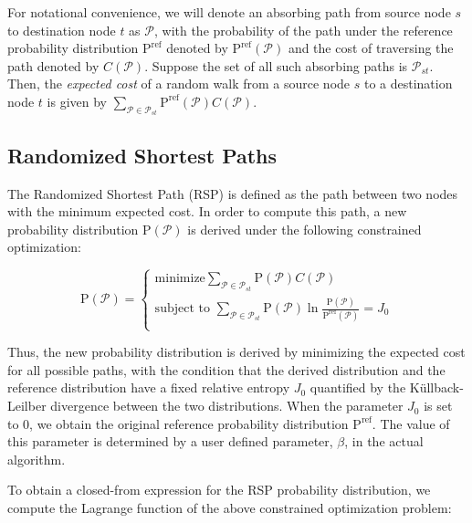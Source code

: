 For notational convenience, we will denote an absorbing path from source node $s$ to destination node $t$ as $\mathcal{P}$, with the probability of the path under the reference probability distribution $\mathrm{P^{ref}}$ denoted by $\mathrm{P^{ref}}(\mathcal{P})$ and the cost of traversing the path denoted by $C(\mathcal{P})$. Suppose the set of all such absorbing paths is $\mathcal{P}_{st}$. Then, the \emph{expected cost} of a random walk from a source node $s$ to a destination node $t$ is given by $\sum\limits_{\mathcal{P} \in \mathcal{P}_{st}} \mathrm{P^{ref}}(\mathcal{P})C(\mathcal{P})$.


\subsection{Randomized Shortest Paths}

The Randomized Shortest Path (RSP) is defined as the path between two nodes with the minimum expected cost. In order to compute this path, a new probability distribution $\mathrm{P}(\mathcal{P})$ is derived under the following constrained optimization:

  \begin{equation}
    \mathrm{P}(\mathcal{P})=\left\{
                \begin{array}{ll}
                  \text{minimize} \sum\limits_{\mathcal{P} \in \mathcal{P}_{st}} \mathrm{P}(\mathcal{P})C(\mathcal{P}) \\
                  \text{subject to } \sum\limits_{\mathcal{P} \in \mathcal{P}_{st}} \mathrm{P}(\mathcal{P}) \ln \frac{\mathrm{P}(\mathcal{P}) } { \mathrm{P^{ref}}(\mathcal{P})} = J_0\\

                \end{array}
              \right.
\end{equation}

Thus, the new probability distribution is derived by minimizing the expected cost for all possible paths, with the condition that the derived distribution and the reference distribution have a fixed relative entropy $J_0$ quantified by the K\"ullback-Leilber divergence between the two distributions. When the parameter $J_0$ is set to 0, we obtain the original reference probability distribution $\mathrm{P^{ref}}$. The value of this parameter is determined by a user defined parameter, $\beta$, in the actual algorithm.

To obtain a closed-from expression for the RSP probability distribution, we compute the Lagrange function of the above constrained optimization problem:

